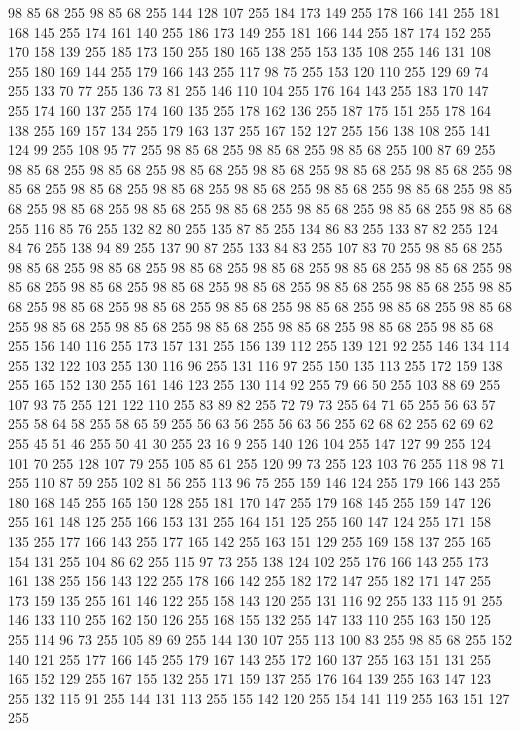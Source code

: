 98 85 68 255 98 85 68 255 144 128 107 255 184 173 149 255 178 166 141 255 181 168 145 255 174 161 140 255 186 173 149 255 181 166 144 255 187 174 152 255 170 158 139 255 185 173 150 255 180 165 138 255 153 135 108 255 146 131 108 255 180 169 144 255 179 166 143 255 117 98 75 255 153 120 110 255 129 69 74 255 133 70 77 255 136 73 81 255 146 110 104 255 176 164 143 255 183 170 147 255 174 160 137 255 174 160 135 255 178 162 136 255 187 175 151 255 178 164 138 255 169 157 134 255 179 163 137 255 167 152 127 255 156 138 108 255 141 124 99 255 108 95 77 255 98 85 68 255 98 85 68 255 98 85 68 255 100 87 69 255 98 85 68 255 98 85 68 255 98 85 68 255 98 85 68 255 98 85 68 255 98 85 68 255 98 85 68 255 98 85 68 255 98 85 68 255 98 85 68 255 98 85 68 255 98 85 68 255 98 85 68 255 98 85 68 255 98 85 68 255 98 85 68 255 98 85 68 255 98 85 68 255 98 85 68 255 116 85 76 255 132 82 80 255 135 87 85 255 134 86 83 255 133 87 82 255
124 84 76 255 138 94 89 255 137 90 87 255 133 84 83 255 107 83 70 255 98 85 68 255 98 85 68 255 98 85 68 255 98 85 68 255 98 85 68 255 98 85 68 255 98 85 68 255 98 85 68 255 98 85 68 255 98 85 68 255 98 85 68 255 98 85 68 255 98 85 68 255 98 85 68 255 98 85 68 255 98 85 68 255 98 85 68 255 98 85 68 255 98 85 68 255 98 85 68 255 98 85 68 255 98 85 68 255 98 85 68 255 98 85 68 255 98 85 68 255 98 85 68 255 156 140 116 255 173 157 131 255 156 139 112 255 139 121 92 255 146 134 114 255 132 122 103 255 130 116 96 255 131 116 97 255 150 135 113 255 172 159 138 255 165 152 130 255 161 146 123 255 130 114 92 255 79 66 50 255 103 88 69 255 107 93 75 255 121 122 110 255 83 89 82 255 72 79 73 255 64 71 65 255 56 63 57 255 58 64 58 255 58 65 59 255 56 63 56 255 56 63 56 255 62 68 62 255 62 69 62 255 45 51 46 255 50 41 30 255 23 16 9 255 140 126 104 255 147 127 99 255 124 101 70 255
128 107 79 255 105 85 61 255 120 99 73 255 123 103 76 255 118 98 71 255 110 87 59 255 102 81 56 255 113 96 75 255 159 146 124 255 179 166 143 255 180 168 145 255 165 150 128 255 181 170 147 255 179 168 145 255 159 147 126 255 161 148 125 255 166 153 131 255 164 151 125 255 160 147 124 255 171 158 135 255 177 166 143 255 177 165 142 255 163 151 129 255 169 158 137 255 165 154 131 255 104 86 62 255 115 97 73 255 138 124 102 255 176 166 143 255 173 161 138 255 156 143 122 255 178 166 142 255 182 172 147 255 182 171 147 255 173 159 135 255 161 146 122 255 158 143 120 255 131 116 92 255 133 115 91 255 146 133 110 255 162 150 126 255 168 155 132 255 147 133 110 255 163 150 125 255 114 96 73 255 105 89 69 255 144 130 107 255 113 100 83 255 98 85 68 255 152 140 121 255 177 166 145 255 179 167 143 255 172 160 137 255 163 151 131 255 165 152 129 255 167 155 132 255 171 159 137 255 176 164 139 255 163 147 123 255 132 115 91 255 144 131 113 255 155 142 120 255 154 141 119 255 163 151 127 255
